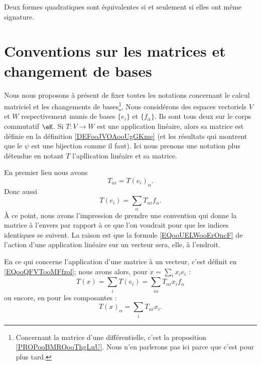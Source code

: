 \begin{proposition}
    Deux formes quadratiques sont équivalentes si et seulement si elles ont même signature.
\end{proposition}


\section{Conventions sur les matrices et changement de bases}
\label{SECooBTTTooZZABWA}

Nous nous proposons à présent de fixer toutes les notations concernant le calcul matriciel et les changements de bases\footnote{Concernant la matrice d'une différentielle, c'est la proposition \ref{PROPooBMROooThgLuU}. Nous n'en parlerons pas ici parce que c'est pour plus tard.}. Nous considérons des espaces vectoriels \( V\) et \( W\) respectivement munis de bases \( \{ e_i \}\) et \( \{ f_{\alpha} \}\). Ils sont tous deux sur le corps  commutatif \( \eK\). Si \( T\colon V\to W \) est une application linéaire, alors sa matrice est définie en la définition \ref{DEFooJVOAooUgGKme} (et les résultats qui montrent que le \( \psi\) est une bijection comme il faut). Ici nous prenons une notation plus détendue en notant \( T\) l'apllication linéaire et sa matrice. 

En premier lieu nous avons
\begin{equation}        \label{EQooOMSCooGsSBIA}
    T_{\alpha i}=T(e_i)_{\alpha}.
\end{equation}
Donc aussi
\begin{equation}
    T(e_i)=\sum_{\alpha}T_{\alpha i}f_{\alpha}.
\end{equation}
À ce point, nous avons l'impression de prendre une convention qui donne la matrice à l'envers par rapport à ce que l'on voudrait pour que les indices identiques se suivent. La raison est que la formule \eqref{EQooUELWooErOncF} de l'action d'une application linéaire sur un vecteur sera, elle, à l'endroit.

En ce qui concerne l'application d'une matrice à un vecteur, c'est définit en \eqref{EQooQFVTooMFfzol}; nous avons alors, pour \( x=\sum_ix_ie_i\) :
\begin{equation}
    T(x)=\sum_iT(e_i)=\sum_{i\alpha}T_{\alpha i}x_if_{\alpha}
\end{equation}
ou encore, en pour les composantes :
\begin{equation}        \label{EQooUELBWooErOncF}
    T(x)_{\alpha}=\sum_{i}T_{\alpha i}x_i.
\end{equation}

